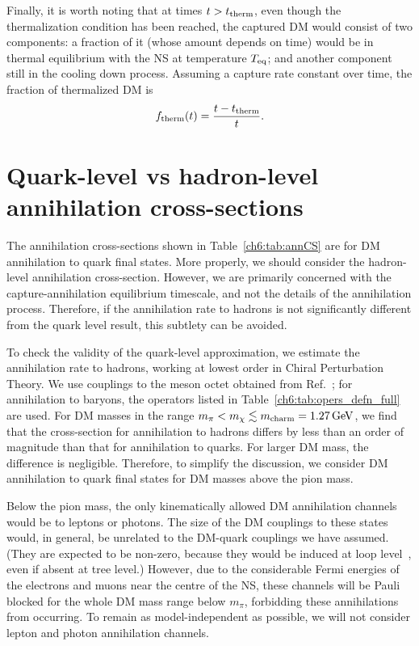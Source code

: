 Finally, it is worth noting that at times  $t>t_{\rm therm}$, even though the thermalization condition has been reached, the captured DM would consist of two components: a fraction of it (whose amount depends on time) would be in thermal equilibrium with the NS at temperature $T_{\rm eq}$; and another component still in the cooling down process. Assuming a  capture rate constant over time, the fraction of thermalized DM is 
\begin{equation}
    f_{\rm therm}(t) = \frac{t-t_{\rm therm}}{t}.
\end{equation}



\section{Quark-level vs hadron-level annihilation cross-sections}
\label{ch6:sec:quarkhadron}

The annihilation cross-sections shown in Table~\ref{ch6:tab:annCS} are for DM annihilation to quark final states.  More properly, we should consider the hadron-level annihilation cross-section.
However, we are primarily concerned with the capture-annihilation equilibrium timescale, and not the details of the annihilation process. Therefore, if the annihilation rate to hadrons is not significantly different from the quark level result, this subtlety can be avoided. 

To check the validity of the quark-level approximation, we estimate the annihilation rate to hadrons, working at lowest order in Chiral Perturbation Theory. We use couplings to the meson octet obtained from  Ref.~\cite{Kumar:2018heq_dec_IndirectDetectionSubGeV}; for annihilation to baryons, the operators listed in Table~\ref{ch6:tab:opers_defn_full} are used. 
For DM masses in the range $m_\pi < m_\chi \lesssim m_{\rm charm} = 1.27{\rm \,GeV}$, we find that the cross-section for annihilation to hadrons differs by less than an order of magnitude than that for annihilation to quarks. For larger DM mass, the difference is negligible. Therefore, to simplify the discussion, we consider DM annihilation to quark final states for DM masses above the pion mass.


Below the pion mass, the only kinematically allowed DM annihilation channels would be to leptons or photons. The size of the DM couplings to these states would, in general, be unrelated to the DM-quark couplings we have assumed. (They are expected to be non-zero, because they would be induced at loop level~\cite{Bell:2019pyc_jun_CaptureLeptophilicDark}, even if absent at tree level.)
However, due to the considerable Fermi energies of the electrons and muons near the centre of the NS, these channels will be Pauli blocked for the whole DM mass range below $m_\pi$, forbidding these annihilations from occurring. To remain as model-independent as possible, we will not consider lepton and photon annihilation channels.

